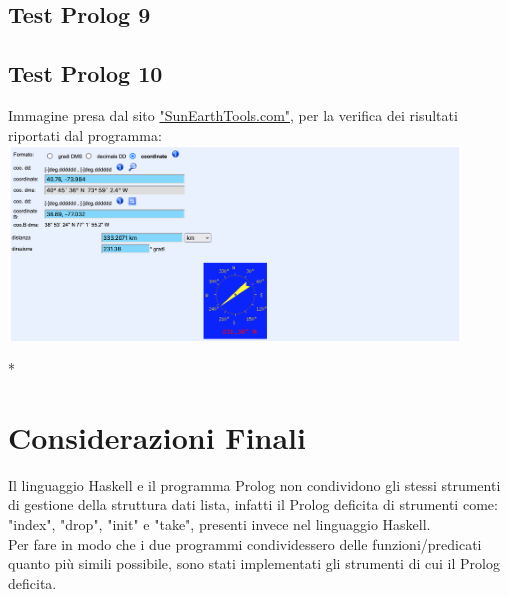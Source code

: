 \documentclass{article}
\begin{document}
\lstset{inputencoding=utf8/latin1}


\subsection*{Test Prolog 9}

\lstset{inputencoding=utf8/latin1}


\subsection*{Test Prolog 10}

\lstset{inputencoding=utf8/latin1}


	\bigskip
	Immagine presa dal sito \href{https://www.sunearthtools.com/it/tools/distance.php}{"SunEarthTools.com"}, per la verifica dei risultati riportati dal programma:\\
	\includegraphics[width=0.9\textwidth]{Prolog_Tests/10-Calculation_of_Distant_Coordinates_Check}
\newpage

\/*
\section{Considerazioni Finali}
\raggedright

Il linguaggio Haskell e il programma Prolog non condividono gli stessi strumenti di gestione della struttura dati lista, infatti il Prolog deficita di strumenti come: "index", "drop", "init" e "take", presenti invece nel linguaggio Haskell.\\
Per fare in modo che i due programmi condividessero delle funzioni/predicati quanto più simili possibile, sono stati implementati gli strumenti di cui il Prolog deficita.\\
%
\end{document}
